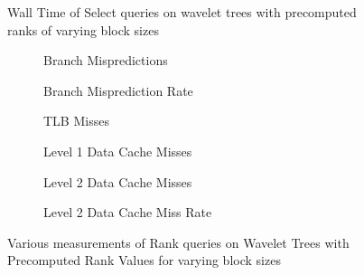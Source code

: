 \begin{figure}

\caption{Wall Time of Select queries on wavelet trees with precomputed ranks of varying block sizes}
\label{fig:PrecomputedRankBlockSize_Select_WallTime}
\end{figure}


\begin{figure}\tiny
\begin{subfigure}{0.48\textwidth}
	
	\caption{Branch Mispredictions}
	\label{fig:PrecomputedRankBlockSize_Rank_BranchMiss}
\end{subfigure}
\hfill
\begin{subfigure}{0.48\textwidth}
	
	\caption{Branch Misprediction Rate}
	\label{fig:PrecomputedRankBlockSize_Rank_BranchMissRate}
\end{subfigure}
\begin{subfigure}{0.48\textwidth}
	
	\caption{TLB Misses}
	\label{fig:PrecomputedRankBlockSize_Rank_TLB}
\end{subfigure}
\hfill
\begin{subfigure}{0.48\textwidth}
	
	\caption{Level 1 Data Cache Misses}
	\label{fig:PrecomputedRankBlockSize_Rank_L1CacheMiss}
\end{subfigure}
\begin{subfigure}{0.48\textwidth}
	
	\caption{Level 2 Data Cache Misses}
	\label{fig:PrecomputedRankBlockSize_Rank_L2CacheMiss}
\end{subfigure}
\hfill
\begin{subfigure}{0.48\textwidth}
	
	\caption{Level 2 Data Cache Miss Rate}
	\label{fig:PrecomputedRankBlockSize_Rank_L2CacheMissRate}
\end{subfigure}
\caption{Various measurements of Rank queries on Wavelet Trees with Precomputed Rank Values for varying block sizes}
\label{fig:PrecomputedRankBlockSize_Rank}
\end{figure}

%

%



